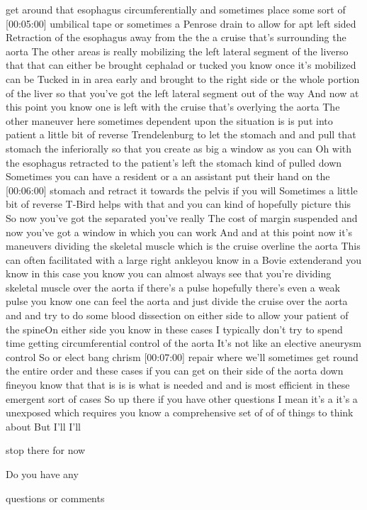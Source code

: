 \documentclass[
]{book}
\begin{document}
get around that esophagus circumferentially and sometimes place some
sort of {[}00:05:00{]} umbilical tape or sometimes a Penrose drain to allow
for apt left sided Retraction of the esophagus away from the the a
cruise that's surrounding the aorta The other areas is really mobilizing
the left lateral segment of the liverso that that can either be brought
cephalad or tucked you know once it's mobilized can be Tucked in in area
early and brought to the right side or the whole portion of the liver so
that you've got the left lateral segment out of the way And now at this
point you know one is left with the cruise that's overlying the aorta
The other maneuver here sometimes dependent upon the situation is is put
into patient a little bit of reverse Trendelenburg to let the stomach
and and pull that stomach the inferiorally so that you create as big a
window as you can Oh with the esophagus retracted to the patient's left
the stomach kind of pulled down Sometimes you can have a resident or a
an assistant put their hand on the {[}00:06:00{]} stomach and retract it
towards the pelvis if you will Sometimes a little bit of reverse T-Bird
helps with that and you can kind of hopefully picture this So now you've
got the separated you've really The cost of margin suspended and now
you've got a window in which you can work And and at this point now it's
maneuvers dividing the skeletal muscle which is the cruise overline the
aorta This can often facilitated with a large right ankleyou know in a
Bovie extenderand you know in this case you know you can almost always
see that you're dividing skeletal muscle over the aorta if there's a
pulse hopefully there's even a weak pulse you know one can feel the
aorta and just divide the cruise over the aorta and and try to do some
blood dissection on either side to allow your patient of the spineOn
either side you know in these cases I typically don't try to spend time
getting circumferential control of the aorta It's not like an elective
aneurysm control So or elect bang chrism {[}00:07:00{]} repair where we'll
sometimes get round the entire order and these cases if you can get on
their side of the aorta down fineyou know that that is is is what is
needed and and is most efficient in these emergent sort of cases So up
there if you have other questions I mean it's a it's a unexposed which
requires you know a comprehensive set of of of things to think about But
I'll I'll

stop there for now

Do you have any

questions or comments
\end{document}
